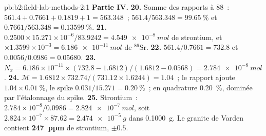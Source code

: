 \begin{solution}{pb:b2:field-lab-methods-2:1}
\noindent\textbf{Partie IV.}
\textbf{20.} Somme des rapports à 88~: $561.4 + 0.7661 + 0.1819 + 1 = 563.348$~; $561.4/563.348 =
\qty{99.65}{\percent}$ et $0.7661/563.348 = \qty{0.13599}{\percent}$.
\textbf{21.} $0.2500 \times 15.271 \times 10^{-6}/83.9242 = \qty{4.549e-8}{mol}$ de strontium, et
$\times 1.3599 \times 10^{-3} = \qty{6.186e-11}{mol}$ de $^{86}\mathrm{Sr}$.
\textbf{22.} $561.4/0.7661 = 732.8$ et $0.0056/0.0986 = 0.05680$.
\textbf{23.} $N_x = 6.186 \times 10^{-11} \times (732.8 - 1.6812)/(1.6812 - 0.0568) =
\qty{2.784e-8}{mol}$.
\textbf{24.} $\mathcal M = 1.6812 \times 732.74/(731.12 \times 1.6244) = 1.04$~; le rapport ajoute
$1.04 \times \qty{0.01}{\percent}$, le spike $0.031/15.271 = \qty{0.20}{\percent}$~; en quadrature
\qty{0.20}{\percent}, dominée par l'étalonnage du spike.
\textbf{25.} Strontium~: $2.784 \times 10^{-8}/0.0986 = \qty{2.824e-7}{mol}$, soit $2.824 \times
10^{-7} \times 87.62 = \qty{2.474e-5}{g}$ dans \qty{0.1000}{g}. Le granite de Varden contient
\textbf{\qty[text-series-to-math=true]{247}{ppm}} de strontium, $\pm 0.5$.
\end{solution}
